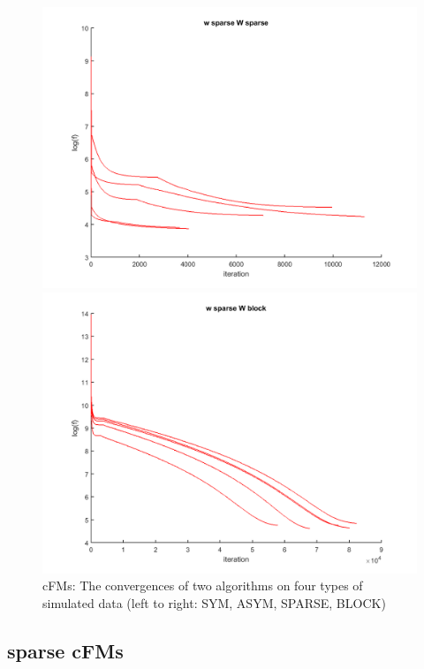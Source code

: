 \documentclass{article}
\begin{document}
\begin{figure}[htbp]
\begin{minipage}{0.24\textwidth}
    \includegraphics[width=1\textwidth]{images/xin_sparse}
  \end{minipage}
  \hfill
  \begin{minipage}{0.24\textwidth}
    \centering
    \includegraphics[width=1\textwidth]{images/xin_block}
  \end{minipage}
  \caption{cFMs: The convergences of two algorithms on four types of simulated data (left to right: SYM, ASYM, SPARSE, BLOCK)}
  \label{fig:cfm_figs}
\end{figure}

\subsection{sparse cFMs} \label{sec:result_scfm}
\end{document}
